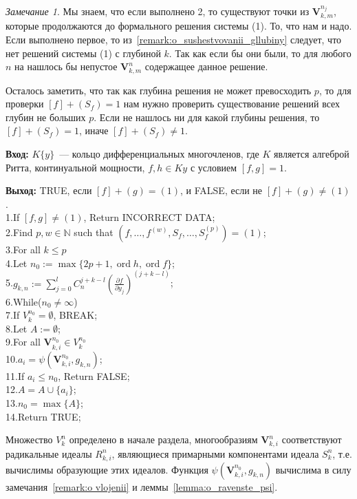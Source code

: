 \documentclass[16pt]{article}
\DeclareMathOperator{\ord}{ord}
\theoremstyle{plain1}
\theoremstyle{plain2}
\theoremstyle{plain}
\theoremstyle{plain3}
\theoremstyle{definition}
\theoremstyle{remark}
\newtheorem*{remark*}{Замечание}
\begin{document}
\begin{remark*}
Мы знаем, что если выполнено 2, то существуют точки из $\mathbf{V}_{k,m}^{n_j}$, которые продолжаются до формального решения системы (1). То, что нам и надо. Если выполнено первое, то из~\ref{remark:o_sushestvovanii_gllubiny} следует, что нет решений системы (1)  с глубиной $k$. Так как если бы они были, то для любого $n$ на нашлось бы непустое $\mathbf{V}_{k,m}^{n}$ содержащее данное решение.

Осталось заметить, что так как глубина решения не может превосходить $p$, то для проверки $[f]+(S_f)=1$ нам нужно проверить существование решений всех глубин не больших $p$. Если не нашлось ни для какой глубины решения, то $[f]+(S_f)=1$, иначе $[f]+(S_f)\neq1$.
\end{remark*}

{\bf Вход:} $K\{y\}$~--- кольцо дифференциальных многочленов, где $K$ является алгеброй Ритта, континуальной мощности, $f,h\in K{y}$ с условием $[f,g]=1$.

{\bf Выход:} TRUE, если  $[f]+(g)=(1)$, и FALSE, если не $[f]+(g)\not=(1)$.
\\
1.\qquad If $[f,g]\not=(1)$, Return  INCORRECT DATA;\\
2.\qquad Find $p,w\in \mathbb{N}$ such that $(f,\ldots,f^{(w)},S_f,\ldots,S_f^{(p)})=(1)$;\\
3.\qquad For all $k\leqslant p$\\
4.\qquad\qquad Let $n_0:=\max\{ 2p+1,\ord{h},\ord{f}\}$;\\
5.\qquad\qquad $g_{k,n}:=\sum\limits_{j=0}^{l}C_n^{j+k - l }\left(\frac{\partial f}{\partial y_j}\right)^{(j+k - l)}$;\\
6.\qquad\qquad While($n_0\not=\infty$)\\
7.\qquad\qquad\qquad If $V_k^{n_0}=\emptyset$, BREAK;\\
8.\qquad\qquad\qquad Let $A:=\emptyset$;\\
9.\qquad\qquad\qquad For all $\mathbf{V}_{k,i}^{n_0}\in V_k^{n_0}$\\
10.\qquad\qquad\qquad\qquad $a_i=\psi(\mathbf{V}_{k,i}^{n_0},g_{k,n})$;\\
11.\qquad\qquad\qquad\qquad If $a_i\leqslant n_0$, Return FALSE;\\
12.\qquad\qquad\qquad\qquad $A=A\cup\{a_i\}$;\\
13.\qquad\qquad\qquad $n_0=\max\{A\}$;\\
14.\qquad Return TRUE;

Множество $V_k^{n}$ определено в начале раздела, многообразиям $\mathbf{V}_{k,i}^{n}$ соответствуют радикальные идеалы $R_{k,i}^{n}$, являющиеся примарными компонентами идеала $S_k^n$, т.е. вычислимы образующие этих идеалов. 
Функция $\psi(\mathbf{V}_{k,i}^{n_0},g_{k,n})$ вычислима в силу замечания~\ref{remark:o vlojenii} и леммы~\ref{lemma:o_ravenste_psi}.
\end{document}

